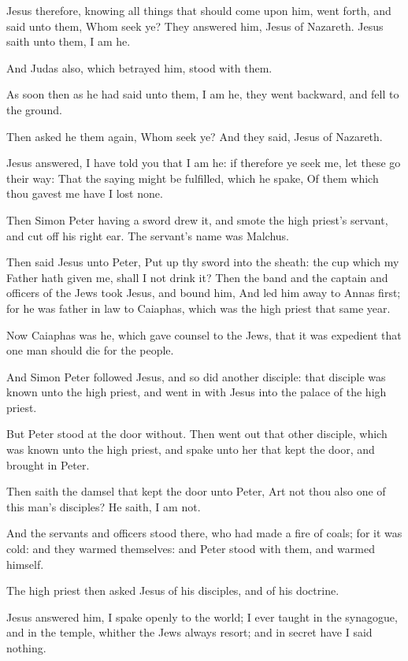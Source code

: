 \verse Jesus therefore, knowing all things that should come upon him, went forth, and said unto them, Whom seek ye?  \verse They answered him, Jesus of Nazareth. Jesus saith unto them, I am he.

And Judas also, which betrayed him, stood with them.

\verse As soon then as he had said unto them, I am he, they went backward, and fell to the ground.

\verse Then asked he them again, Whom seek ye? And they said, Jesus of Nazareth.

\verse Jesus answered, I have told you that I am he: if therefore ye seek me, let these go their way: \verse That the saying might be fulfilled, which he spake, Of them which thou gavest me have I lost none.

\verse Then Simon Peter having a sword drew it, and smote the high priest's servant, and cut off his right ear. The servant's name was Malchus.

\verse Then said Jesus unto Peter, Put up thy sword into the sheath: the cup which my Father hath given me, shall I not drink it?  \verse Then the band and the captain and officers of the Jews took Jesus, and bound him, \verse And led him away to Annas first; for he was father in law to Caiaphas, which was the high priest that same year.

\verse Now Caiaphas was he, which gave counsel to the Jews, that it was expedient that one man should die for the people.

\verse And Simon Peter followed Jesus, and so did another disciple: that disciple was known unto the high priest, and went in with Jesus into the palace of the high priest.

\verse But Peter stood at the door without. Then went out that other disciple, which was known unto the high priest, and spake unto her that kept the door, and brought in Peter.

\verse Then saith the damsel that kept the door unto Peter, Art not thou also one of this man's disciples? He saith, I am not.

\verse And the servants and officers stood there, who had made a fire of coals; for it was cold: and they warmed themselves: and Peter stood with them, and warmed himself.

\verse The high priest then asked Jesus of his disciples, and of his doctrine.

\verse Jesus answered him, I spake openly to the world; I ever taught in the synagogue, and in the temple, whither the Jews always resort; and in secret have I said nothing.

